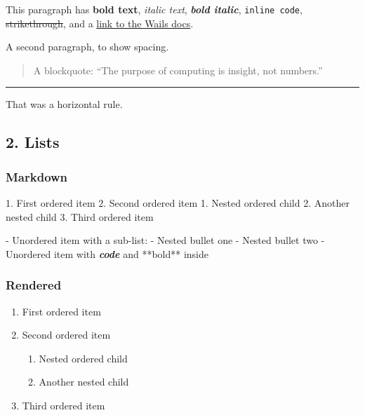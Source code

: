 \documentclass[
]{article}
\newenvironment{Shaded}{}{}
\newcommand{\InformationTok}[1]{\textcolor[rgb]{0.38,0.63,0.69}{\textbf{\textit{#1}}}}
\newcommand{\NormalTok}[1]{#1}
\newcommand{\SpecialStringTok}[1]{\textcolor[rgb]{0.73,0.40,0.53}{#1}}
\providecommand{\tightlist}{%
  \setlength{\itemsep}{0pt}\setlength{\parskip}{0pt}}
\begin{document}
This paragraph has \textbf{bold text}, \emph{italic text},
\textbf{\emph{bold italic}}, \texttt{inline\ code}, \st{strikethrough},
and a \href{https://v3.wails.io}{link to the Wails docs}.

A second paragraph, to show spacing.

\begin{quote}
A blockquote: ``The purpose of computing is insight, not numbers.''
\end{quote}

\begin{center}\rule{0.5\linewidth}{0.5pt}\end{center}

That was a horizontal rule.

\subsection{2. Lists}\label{lists}

\subsubsection{Markdown}\label{markdown-1}

\begin{Shaded}
\begin{Highlighting}[]
\SpecialStringTok{1. }\NormalTok{First ordered item}
\SpecialStringTok{2. }\NormalTok{Second ordered item}
\SpecialStringTok{   1. }\NormalTok{Nested ordered child}
\SpecialStringTok{   2. }\NormalTok{Another nested child}
\SpecialStringTok{3. }\NormalTok{Third ordered item}

\SpecialStringTok{{-} }\NormalTok{Unordered item with a sub{-}list:}
\SpecialStringTok{  {-} }\NormalTok{Nested bullet one}
\SpecialStringTok{  {-} }\NormalTok{Nested bullet two}
\SpecialStringTok{{-} }\NormalTok{Unordered item with }\InformationTok{\textasciigrave{}code\textasciigrave{}}\NormalTok{ and **bold** inside}
\end{Highlighting}
\end{Shaded}

\subsubsection{Rendered}\label{rendered-1}

\begin{enumerate}
\def\labelenumi{\arabic{enumi}.}
\tightlist
\item
  First ordered item
\item
  Second ordered item

  \begin{enumerate}
  \def\labelenumii{\arabic{enumii}.}
  \tightlist
  \item
    Nested ordered child
  \item
    Another nested child
  \end{enumerate}
\item
  Third ordered item
\end{enumerate}
\end{document}
